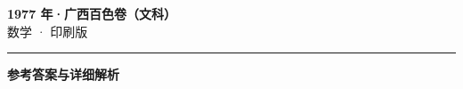 \documentclass[zihao=5, a4paper]{ctexart}
\begin{document}
\begin{center}
  {\Large\bfseries 1977 年·广西百色卷（文科）}\\[4pt]
  {\large 数学 · 印刷版}
\end{center}
\medskip
{}

\par\bigskip\hrule\bigskip
{}
\begin{center}{\large\bfseries 参考答案与详细解析}\end{center}
\smallskip

\end{document}
